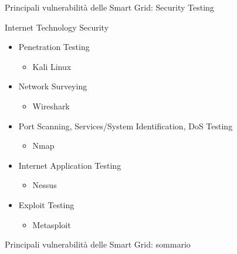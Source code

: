 \begin{frame}{Principali vulnerabilità delle Smart Grid: Security Testing}
\begin{block}{Internet Technology Security}
	\begin{itemize}[<+- | alert@+>]
		\item Penetration Testing
		\begin{itemize}
			\item Kali Linux
		\end{itemize}
		\item Network Surveying
		\begin{itemize}
			\item Wireshark
		\end{itemize}
		\item Port Scanning, Services/System Identification, DoS Testing
		\begin{itemize}
			\item Nmap
		\end{itemize}
		\item Internet Application Testing
		\begin{itemize}
			\item Nessus
		\end{itemize}
		\item Exploit Testing
		\begin{itemize}
			\item Metasploit
		\end{itemize}
	\end{itemize}
\end{block}
\end{frame}

\begin{frame}{Principali vulnerabilità delle Smart Grid: sommario}
\end{frame}

